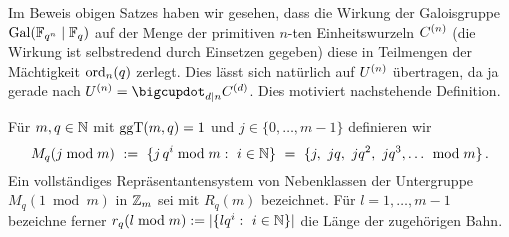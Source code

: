 Im Beweis obigen Satzes haben wir gesehen, dass die Wirkung der Galoisgruppe
$\operatorname{Gal}(\mathbb{F}_{q^n}\mid \mathbb{F}_q)$ auf der Menge der primitiven $n$-ten Einheitswurzeln
$C^{(n)}$ (die Wirkung ist selbstredend durch Einsetzen gegeben) diese in 
Teilmengen der Mächtigkeit $\operatorname{ord}_n(q)$ zerlegt.
Dies lässt sich natürlich auf $U^{(n)}$ übertragen, da ja gerade 
nach 
$U\kl n = \bigcupdot_{d\mid n} C\kl d$. 
Dies motiviert nachstehende Definition.


  


\begin{definition}
  \label{def:nebenklassen_mod_m}
  Für $m,q\in\mathbb{N}$ mit $\operatorname{ggT}(m,q) = 1$ und $j \in \{0,\ldots,m-1\}$ definieren wir
  \[ M_q(j\bmod m) \ :=\  \{ j\,q^i \bmod m:\ i\in\mathbb{N}\} \ =\  
    \{j,\ jq,\ jq^2,\ jq^3,\ldots\ \bmod m\}\,.\]
  Ein vollständiges Repräsentantensystem von Nebenklassen 
  der Untergruppe $M_q(1\bmod m)$
  in $\mathbb{Z}_m$ sei mit $R_q(m)$ bezeichnet. Für $l=1,\ldots,m-1$
  bezeichne ferner
  $r_q(l \bmod m) := |\{lq^i:\ i\in \N \}|$ die Länge der zugehörigen Bahn.
\end{definition}

